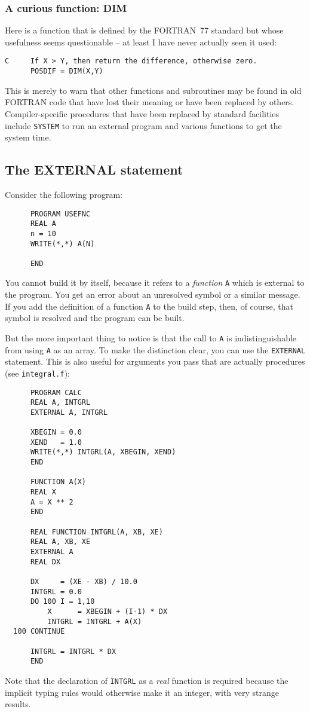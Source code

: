 \subsubsection{A curious function: DIM}
Here is a function that is defined by the FORTRAN~77 standard but whose usefulness
seems questionable -- at least I have never actually seen it used:
%
\begin{verbatim}
C     If X > Y, then return the difference, otherwise zero.
      POSDIF = DIM(X,Y)
\end{verbatim}

This is merely to warn that other functions and subroutines may be found
in old FORTRAN code that have lost their meaning or have been replaced by others.
Compiler-specific procedures that have been replaced by standard facilities include
\verb+SYSTEM+ to run an external program and various functions to get the system time.


\subsection{The EXTERNAL statement}
Consider the following program:
%
\begin{verbatim}
      PROGRAM USEFNC
      REAL A
      n = 10
      WRITE(*,*) A(N)

      END
\end{verbatim}

You cannot build it by itself, because it refers to a \emph{function} \verb+A+ which is external
to the program. You get an error about an unresolved symbol or a similar message.
If you add the definition of a function \verb+A+ to the build step, then, of course,
that symbol is resolved and the program can be built.

But the more important thing to notice is that the call to \verb+A+ is indistinguishable
from using \verb+A+ as an array. To make the distinction clear, you can use the
\verb+EXTERNAL+ statement. This is also useful for arguments you pass that are actually
procedures (see \verb+integral.f+):
%
\begin{verbatim}
      PROGRAM CALC
      REAL A, INTGRL
      EXTERNAL A, INTGRL

      XBEGIN = 0.0
      XEND   = 1.0
      WRITE(*,*) INTGRL(A, XBEGIN, XEND)
      END

      FUNCTION A(X)
      REAL X
      A = X ** 2
      END

      REAL FUNCTION INTGRL(A, XB, XE)
      REAL A, XB, XE
      EXTERNAL A
      REAL DX

      DX     = (XE - XB) / 10.0
      INTGRL = 0.0
      DO 100 I = 1,10
          X      = XBEGIN + (I-1) * DX
          INTGRL = INTGRL + A(X)
  100 CONTINUE

      INTGRL = INTGRL * DX
      END
\end{verbatim}
%
Note that the declaration of \verb+INTGRL+ as a \emph{real} function is required
because the implicit typing rules would otherwise make it an integer, with very
strange results.

